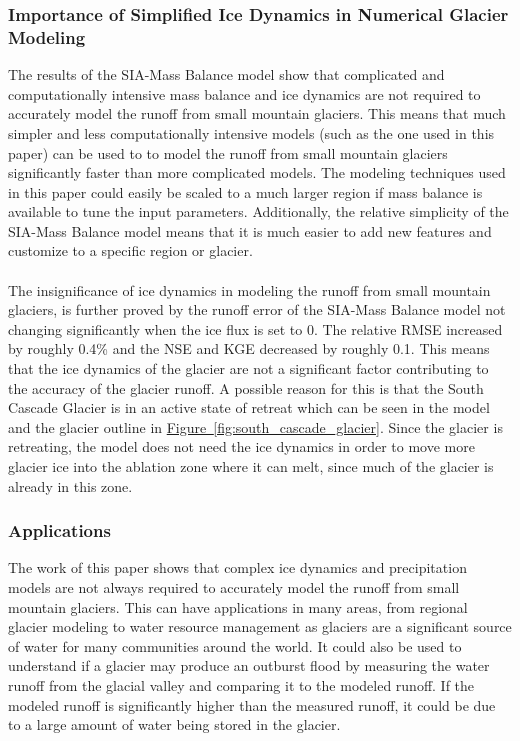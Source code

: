 \documentclass{article}
\begin{document}
\subsubsection{Importance of Simplified Ice Dynamics in Numerical Glacier Modeling}
The results of the SIA-Mass Balance model show that complicated and computationally intensive mass balance and ice dynamics are not required to accurately model the 
runoff from small mountain glaciers. This means that much simpler and less computationally intensive models (such as the one used 
in this paper) can be used to to model the runoff from small mountain glaciers significantly faster than more complicated models. The modeling techniques used in this paper could 
easily be scaled to a much larger region if mass balance is available to tune the input parameters. Additionally, the relative simplicity of the SIA-Mass Balance model 
means that it is much easier to add new features and customize to a specific region or glacier.
\paragraph{}
The insignificance of ice dynamics in modeling the runoff from small mountain glaciers, is further proved by the runoff error of the SIA-Mass Balance model not changing significantly
when the ice flux is set to 0. The relative RMSE increased by roughly 0.4\% and the NSE and KGE decreased by roughly 0.1. This means that the ice dynamics of the glacier are not a significant factor contributing to the accuracy of the glacier runoff. 
A possible reason for this is that the South Cascade Glacier is in an active state of retreat which can be seen in the model and the 
glacier outline in \hyperref[fig:south_cascade_glacier]{Figure~\ref{fig:south_cascade_glacier}}. Since the glacier is retreating, the model does not need the ice dynamics in order to move more glacier ice into the ablation zone 
where it can melt, since much of the glacier is already in this zone.
\subsubsection{Applications}
The work of this paper shows that complex ice dynamics and precipitation models are not always required to accurately model the runoff from small mountain glaciers. This 
can have applications in many areas, from regional glacier modeling to water resource management as glaciers are a significant source of water 
for many communities around the world. It could also be used to understand if a glacier may produce an outburst flood by measuring the water runoff from the glacial valley 
and comparing it to the modeled runoff. If the modeled runoff is significantly higher than the measured runoff, it could be due to a large amount of water being stored in the glacier.
\end{document}
